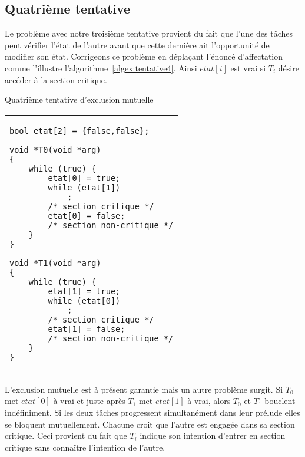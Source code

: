 \subsection*{Quatrième tentative}
Le problème avec notre troisième tentative provient du fait que l'une des tâches peut vérifier l'état de l'autre avant que cette dernière ait l'opportunité de modifier son état.  Corrigeons ce problème en déplaçant l'énoncé d'affectation comme l'illustre l'algorithme~\ref{algex:tentative4}.
Ainsi $etat[i]$ est vrai si $T_i$ désire accéder à la section critique.
\begin{algorithm}[!ht]
\caption{Quatrième tentative d'exclusion mutuelle}\label{algex:tentative4}
\centering
\begin{tabular}{l}
\lstset{language=C++}
\begin{lstlisting}
bool etat[2] = {false,false};

void *T0(void *arg)
{
	while (true) {
		etat[0] = true;
		while (etat[1])
			;
		/* section critique */
		etat[0] = false;
		/* section non-critique */
	}
}

void *T1(void *arg)
{
	while (true) {
		etat[1] = true;
		while (etat[0])
			;
		/* section critique */
		etat[1] = false;
		/* section non-critique */
	}
}
\end{lstlisting}
\end{tabular}

\end{algorithm}

L'exclusion mutuelle est à présent garantie mais un autre problème surgit.
Si $T_0$ met $etat[0]$ à vrai et juste après $T_1$ met $etat[1]$ à vrai, alors $T_0$ et $T_1$ bouclent indéfiniment.
Si les deux tâches progressent simultanément dans leur prélude elles se bloquent mutuellement.
Chacune croit que l'autre est engagée dans sa section critique.
Ceci provient du fait que $T_i$ indique son intention d'entrer en section critique sans connaître l'intention de l'autre.

